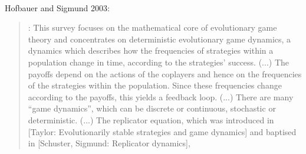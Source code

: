\documentclass[a4paper,10pt]{article}
\begin{document}
\\

Hofbauer and Sigmund 2003:
\begin{quotation} \cite{hofbauer2003-evolutionaryGameDynamics}:
    This survey focuses on the mathematical core of evolutionary game theory and concentrates on deterministic evolutionary game dynamics, a dynamics which describes how the frequencies of strategies within a population change in time, according to the strategies' success.
    (...)
    The payoffs depend on the actions of the coplayers and hence on the frequencies of the strategies within the population. Since these frequencies change according to the payoffs, this yields a feedback loop.
    (...)
    There are many ``game dynamics'', which can be discrete or continuous, stochastic or deterministic.
    (...)
    The replicator equation, which was introduced in [Taylor: Evolutionarily stable strategies and game dynamics] and baptised in [Schuster, Sigmund: Replicator dynamics],
\end{quotation}


\\
\end{document}
